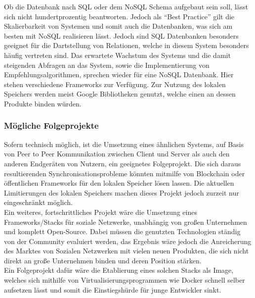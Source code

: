 Ob die Datenbank nach SQL oder dem NoSQL Schema aufgebaut sein soll, lässt sich nicht hundertprozentig beantworten. Jedoch als {``Best Practice''} gilt die Skalierbarkeit von Systemen und somit auch die Datenbanken, was sich am besten mit NoSQL realisieren lässt. Jedoch sind SQL Datenbanken besonders geeignet für die Dartstellung von Relationen, welche in diesem System besonders häufig vertreten sind. Das erwartete Wachstum des Systems und die damit steigenden Abfragen an das System, sowie die Implementierung von Empfehlungsalgorithmen, sprechen wieder für eine NoSQL Datenbank. Hier stehen verschiedene Frameworks zur Verfügung. Zur Nutzung des lokalen Speichers werden meist Google Bibliotheken genutzt, welche einen an dessen Produkte binden würden.

\subsubsection{Mögliche Folgeprojekte}
Sofern technisch möglich, ist die Umsetzung eines ähnlichen Systems, auf Basis von Peer to Peer Kommunikation zwischen Client und Server als auch den anderen Endgeräten von Nutzern, ein geeignetes Folgeprojekt. Die sich daraus resultierenden Synchronisationsprobleme könnten mitmilfe von Blockchain oder öffentlichen Frameworks für den lokalen Speicher lösen lassen. Die aktuellen Limitierungen des lokalen Speichers machen dieses Projekt jedoch zurzeit nur eingeschränkt möglich. \\

Ein weiteres, fortschrittliches Projekt wäre die Umsetzung eines Frameworks/Stacks für soziale Netzwerke, unabhängig von großen Unternehmen und komplett Open-Source. Dabei müssen die genutzten Technologien ständig von der Community evaluiert werden, das Ergebnis wäre jedoch die Anreicherung des Marktes von Sozialen Netzwerken mit vielen neuen Produkten, die sich nicht direkt an große Unternehmen binden und deren Position stärken. \\

Ein Folgeprojekt dafür wäre die Etablierung eines solchen Stacks als Image, welches sich mithilfe von Virtualisierungsprogrammen wie Docker schnell selber aufsetzen lässt und somit die Einstiegshürde für junge Entwickler sinkt.